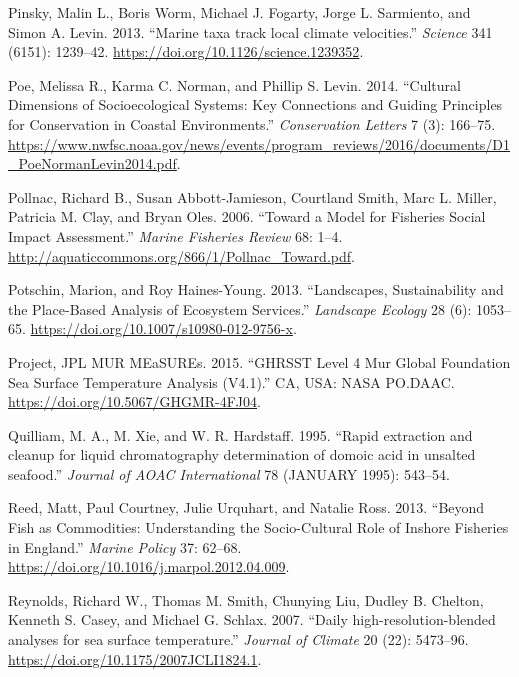 \documentclass[
]{book}
\begin{document}
\leavevmode\hypertarget{ref-Pinsky2013}{}%
Pinsky, Malin L., Boris Worm, Michael J. Fogarty, Jorge L. Sarmiento, and Simon A. Levin. 2013. ``Marine taxa track local climate velocities.'' \emph{Science} 341 (6151): 1239--42. \url{https://doi.org/10.1126/science.1239352}.

\leavevmode\hypertarget{ref-poe_cultural_2014}{}%
Poe, Melissa R., Karma C. Norman, and Phillip S. Levin. 2014. ``Cultural Dimensions of Socioecological Systems: Key Connections and Guiding Principles for Conservation in Coastal Environments.'' \emph{Conservation Letters} 7 (3): 166--75. \url{https://www.nwfsc.noaa.gov/news/events/program_reviews/2016/documents/D1_PoeNormanLevin2014.pdf}.

\leavevmode\hypertarget{ref-pollnac_toward_2006}{}%
Pollnac, Richard B., Susan Abbott-Jamieson, Courtland Smith, Marc L. Miller, Patricia M. Clay, and Bryan Oles. 2006. ``Toward a Model for Fisheries Social Impact Assessment.'' \emph{Marine Fisheries Review} 68: 1--4. \url{http://aquaticcommons.org/866/1/Pollnac_Toward.pdf}.

\leavevmode\hypertarget{ref-potschin_landscapes_2013}{}%
Potschin, Marion, and Roy Haines-Young. 2013. ``Landscapes, Sustainability and the Place-Based Analysis of Ecosystem Services.'' \emph{Landscape Ecology} 28 (6): 1053--65. \url{https://doi.org/10.1007/s10980-012-9756-x}.

\leavevmode\hypertarget{ref-SOE14}{}%
Project, JPL MUR MEaSUREs. 2015. ``GHRSST Level 4 Mur Global Foundation Sea Surface Temperature Analysis (V4.1).'' CA, USA: NASA PO.DAAC. \url{https://doi.org/10.5067/GHGMR-4FJ04}.

\leavevmode\hypertarget{ref-Quilliam1995}{}%
Quilliam, M. A., M. Xie, and W. R. Hardstaff. 1995. ``Rapid extraction and cleanup for liquid chromatography determination of domoic acid in unsalted seafood.'' \emph{Journal of AOAC International} 78 (JANUARY 1995): 543--54.

\leavevmode\hypertarget{ref-reed_beyond_2013}{}%
Reed, Matt, Paul Courtney, Julie Urquhart, and Natalie Ross. 2013. ``Beyond Fish as Commodities: Understanding the Socio-Cultural Role of Inshore Fisheries in England.'' \emph{Marine Policy} 37: 62--68. \url{https://doi.org/10.1016/j.marpol.2012.04.009}.

\leavevmode\hypertarget{ref-Reynolds2007}{}%
Reynolds, Richard W., Thomas M. Smith, Chunying Liu, Dudley B. Chelton, Kenneth S. Casey, and Michael G. Schlax. 2007. ``Daily high-resolution-blended analyses for sea surface temperature.'' \emph{Journal of Climate} 20 (22): 5473--96. \url{https://doi.org/10.1175/2007JCLI1824.1}.
\end{document}
